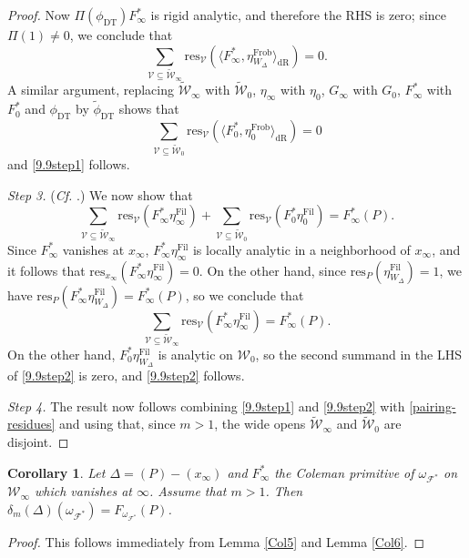 \documentclass[a4paper,11pt]{amsart}
\numberwithin{equation}{section}
\theoremstyle{plain}
\newtheorem{corollary}[theorem]{Corollary}
\theoremstyle{definition}
\theoremstyle{remark}
\newcommand{\res}{\mathrm{res}}
\newcommand{\dR}{\mathrm{dR}}
\begin{document}
\begin{proof}
Now $\Pi(\phi_\mathrm{DT})F_\infty^*$ is rigid analytic, and therefore the RHS is zero; since $\Pi(1)\neq0$, we conclude that 
\[\sum_{\mathcal{V}\subseteq\widetilde{\mathcal{W}}_\infty}\res_{\mathcal{V}}(\langle F_\infty^*,\eta_{W_\Delta}^{\mathrm{Frob}}\rangle_\dR)=0.\] A similar argument, replacing $\widetilde{\mathcal{W}}_\infty$ with $\widetilde{\mathcal{W}}_0$, $\eta_\infty$ with $\eta_0$, $G_\infty$ with $G_0$, $F_\infty^*$ with $F_0^*$ and $\phi_\mathrm{DT}$ by $\tilde\phi_\mathrm{DT}$ shows that 
\[\sum_{\mathcal{V}\subseteq\widetilde{\mathcal{W}}_0}\res_{\mathcal{V}}(\langle F_0^*,\eta_{0}^{\mathrm{Frob}}\rangle_\dR)=0\] and \eqref{9.9step1} follows. 


\emph{Step 3.} (\emph{Cf.} \cite[Lemma 3.19]{BDP}.) We now show that 
\begin{equation}\label{9.9step2}
\sum_{\mathcal{V}\subseteq\widetilde{\mathcal{W}}_\infty}\res_\mathcal{V}(F^*_\infty\eta_{\infty}^{\mathrm{Fil}})+\sum_{\mathcal{V}\subseteq\widetilde{\mathcal{W}}_0}\res_\mathcal{V}(F^*_0\eta_{0}^{\mathrm{Fil}})=F^*_\infty(P).\end{equation}
Since $F_\infty^*$ vanishes at $x_\infty$, $F^*_\infty\eta^\mathrm{Fil}_{\infty}$ is locally analytic in a neighborhood of $x_\infty$, and it follows that $\res_{x_\infty}(F^*_\infty\eta^\mathrm{Fil}_{\infty})=0$. 
On the other hand, since $\res_P(\eta^\mathrm{Fil}_{W_\Delta})=1$, we have $\res_P(F_\infty^*\eta^{\mathrm{Fil}}_{W_\Delta})=F_\infty^*(P)$, so we conclude that 
\[\sum_{\mathcal{V}\subseteq\widetilde{\mathcal{W}}_\infty}\res_\mathcal{V}(F^*_\infty\eta_{\infty}^{\mathrm{Fil}})=F^*_\infty(P).\]
On the other hand, $F_0^*\eta_{W_\Delta}^\mathrm{Fil}$ is analytic on $\mathcal{W}_0$, so the second summand in the LHS of \eqref{9.9step2} is zero, and \eqref{9.9step2} follows. 

\emph{Step 4.} The result now follows combining \eqref{9.9step1} and \eqref{9.9step2} with \eqref{pairing-residues} and using that, since $m>1$, the wide opens $\widetilde{\mathcal{W}}_\infty$ 
and $\widetilde{\mathcal{W}}_0$ are disjoint.  
\end{proof}

\begin{corollary}\label{CoroCole} Let $\Delta=(P)-(x_\infty)$ and $F_\infty^*$ the Coleman primitive of $\omega_{\mathcal{F}^*}$ on $\mathcal{W}_\infty$ which vanishes at $\infty$. Assume that $m>1$. Then 
$\delta_m(\Delta)(\omega_{\mathcal{F}^*})=F_{\omega_{\mathcal{F}^*}}(P)$. 
\end{corollary} 
\begin{proof}
This follows immediately from Lemma \ref{Col5} and Lemma \ref{Col6}. 
\end{proof}
\end{document}
